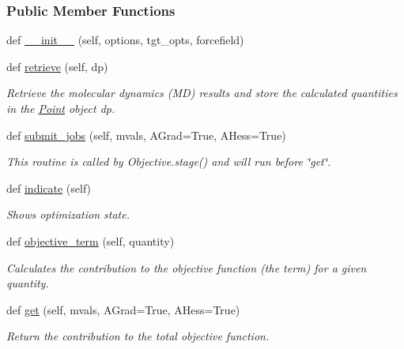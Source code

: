 \subsubsection*{Public Member Functions}
\begin{DoxyCompactItemize}
\item 
def \hyperlink{classsrc_1_1thermo_1_1Thermo_a3278db2b6681f25efdd8185c9d2ac4fe}{\+\_\+\+\_\+init\+\_\+\+\_\+} (self, options, tgt\+\_\+opts, forcefield)
\item 
def \hyperlink{classsrc_1_1thermo_1_1Thermo_a9d63adfe6c3808c186a47d194de9d851}{retrieve} (self, dp)
\begin{DoxyCompactList}\small\item\em Retrieve the molecular dynamics (MD) results and store the calculated quantities in the \hyperlink{classsrc_1_1thermo_1_1Point}{Point} object dp. \end{DoxyCompactList}\item 
def \hyperlink{classsrc_1_1thermo_1_1Thermo_a9f614671342b1e8cdd55ce4c8b153242}{submit\+\_\+jobs} (self, mvals, A\+Grad=True, A\+Hess=True)
\begin{DoxyCompactList}\small\item\em This routine is called by Objective.\+stage() and will run before \char`\"{}get\char`\"{}. \end{DoxyCompactList}\item 
def \hyperlink{classsrc_1_1thermo_1_1Thermo_a608afc83596d03d41f3860ce4bcedfea}{indicate} (self)
\begin{DoxyCompactList}\small\item\em Shows optimization state. \end{DoxyCompactList}\item 
def \hyperlink{classsrc_1_1thermo_1_1Thermo_abb7c8739b6b88d7dd08a80f5561ba6f1}{objective\+\_\+term} (self, quantity)
\begin{DoxyCompactList}\small\item\em Calculates the contribution to the objective function (the term) for a given quantity. \end{DoxyCompactList}\item 
def \hyperlink{classsrc_1_1thermo_1_1Thermo_ac47eddac7bd3b77ef6f575941946f4bf}{get} (self, mvals, A\+Grad=True, A\+Hess=True)
\begin{DoxyCompactList}\small\item\em Return the contribution to the total objective function. \end{DoxyCompactList}\end{DoxyCompactItemize}
